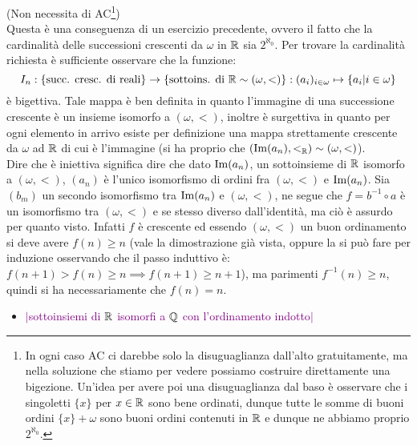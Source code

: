\begin{soln}
	(Non necessita di AC\footnote{In ogni caso AC ci darebbe solo la disuguaglianza dall'alto gratuitamente, ma nella soluzione che stiamo per vedere possiamo costruire direttamente una bigezione. Un'idea per avere poi una disuguaglianza dal baso è osservare che i singoletti $\{x\}$ per $x \in \mathbb R$ sono bene ordinati, dunque tutte le somme di buoni ordini $\{x\} + \omega$ sono buoni ordini contenuti in $\mathbb R$ e dunque ne abbiamo proprio $2^{\aleph_0}$.})\\
	Questa è una conseguenza di un esercizio precedente, ovvero il fatto che la cardinalità delle successioni crescenti da $\omega$ in $\mathbb R$ sia $2^{\aleph_0}$. Per trovare la cardinalità richiesta è sufficiente osservare che la funzione:
	\[ I_n : \{\text{succ. cresc. di reali}\} \to \{\text{sottoins. di $\mathbb R \sim (\omega,<)$}\} : (a_i)_{i \in \omega} \mapsto \{a_i | i \in \omega\}
		\]
	è bigettiva. Tale mappa è ben definita in quanto l'immagine di una successione crescente è un insieme isomorfo a $(\omega,<)$, inoltre è surgettiva in quanto per ogni elemento in arrivo esiste per definizione una mappa strettamente crescente da $\omega$ ad $\mathbb R$ di cui è l'immagine (si ha proprio che $(\operatorname{Im}(a_n),<_{\mathbb R}) \sim (\omega,<)$).\\
	Dire che è iniettiva significa dire che dato $\operatorname{Im}(a_n)$, un sottoinsieme di $\mathbb R$ isomorfo a $(\omega,<)$, $(a_n)$ è l'unico isomorfismo di ordini fra $(\omega,<)$ e $\operatorname{Im}(a_n)$. Sia $(b_m)$ un secondo isomorfismo tra $\operatorname{Im}(a_n)$ e $(\omega,<)$, ne segue che $f = b^{-1} \circ a$ è un isomorfismo tra $(\omega,<)$ e se stesso diverso dall'identità, ma ciò è assurdo per quanto visto.
	Infatti $f$ è crescente ed essendo $(\omega,<)$ un buon ordinamento si deve avere $f(n) \geq n$ (vale la dimostrazione già vista, oppure la si può fare per induzione osservando che il passo induttivo è: $f(n+1) > f(n) \geq n \implies f(n+1) \geq n+1$), ma parimenti $f^{-1}(n) \geq n$, quindi si ha necessariamente che $f(n) = n$.
\end{soln}

\begin{itemize}
	\item \textcolor{purple}{$|$sottoinsiemi di $\mathbb R$ isomorfi a $\mathbb Q$ con l'ordinamento indotto$|$}
\end{itemize}

